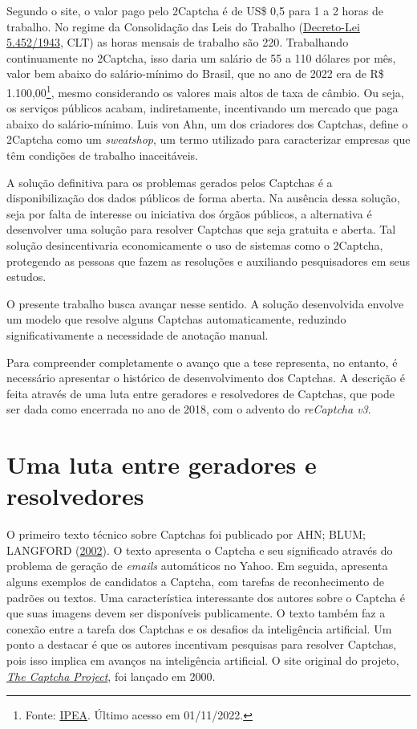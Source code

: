 \documentclass[12pt,twoside,brazilian]{book}
\begin{document}
Segundo o site, o valor pago pelo 2Captcha é de US\$ 0,5 para 1 a 2
horas de trabalho. No regime da Consolidação das Leis do Trabalho
(\href{https://www.planalto.gov.br/ccivil_03/decreto-lei/del5452.htm}{Decreto-Lei
5.452/1943}, CLT) as horas mensais de trabalho são 220. Trabalhando
continuamente no 2Captcha, isso daria um salário de 55 a 110 dólares por
mês, valor bem abaixo do salário-mínimo do Brasil, que no ano de 2022
era de R\$ 1.100,00\footnote{Fonte:
  \href{http://www.ipeadata.gov.br/exibeserie.aspx?stub=1\&serid1739471028=1739471028}{IPEA}.
  Último acesso em 01/11/2022.}, mesmo considerando os valores mais
altos de taxa de câmbio. Ou seja, os serviços públicos acabam,
indiretamente, incentivando um mercado que paga abaixo do
salário-mínimo. Luis von Ahn, um dos criadores dos Captchas, define o
2Captcha como um \emph{sweatshop}, um termo utilizado para caracterizar
empresas que têm condições de trabalho inaceitáveis.

A solução definitiva para os problemas gerados pelos Captchas é a
disponibilização dos dados públicos de forma aberta. Na ausência dessa
solução, seja por falta de interesse ou iniciativa dos órgãos públicos,
a alternativa é desenvolver uma solução para resolver Captchas que seja
gratuita e aberta. Tal solução desincentivaria economicamente o uso de
sistemas como o 2Captcha, protegendo as pessoas que fazem as resoluções
e auxiliando pesquisadores em seus estudos.

O presente trabalho busca avançar nesse sentido. A solução desenvolvida
envolve um modelo que resolve alguns Captchas automaticamente, reduzindo
significativamente a necessidade de anotação manual.

Para compreender completamente o avanço que a tese representa, no
entanto, é necessário apresentar o histórico de desenvolvimento dos
Captchas. A descrição é feita através de uma luta entre geradores e
resolvedores de Captchas, que pode ser dada como encerrada no ano de
2018, com o advento do \emph{reCaptcha v3}.

\hypertarget{sec-historia}{%
\section{Uma luta entre geradores e resolvedores}\label{sec-historia}}

O primeiro texto técnico sobre Captchas foi publicado por AHN; BLUM;
LANGFORD
(\protect\hyperlink{ref-vonahnTellingHumansComputers2002}{2002}). O
texto apresenta o Captcha e seu significado através do problema de
geração de \emph{emails} automáticos no Yahoo. Em seguida, apresenta
alguns exemplos de candidatos a Captcha, com tarefas de reconhecimento
de padrões ou textos. Uma característica interessante dos autores sobre
o Captcha é que suas imagens devem ser disponíveis publicamente. O texto
também faz a conexão entre a tarefa dos Captchas e os desafios da
inteligência artificial. Um ponto a destacar é que os autores incentivam
pesquisas para resolver Captchas, pois isso implica em avanços na
inteligência artificial. O site original do projeto,
\href{https://web.archive.org/web/20010723114217/http://www.captcha.net/}{\emph{The
Captcha Project}}, foi lançado em 2000.
\end{document}
